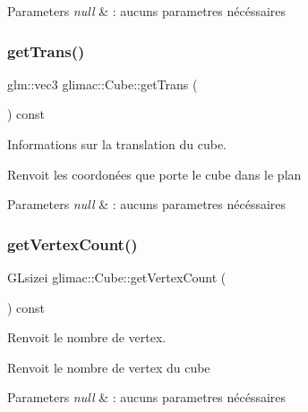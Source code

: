 \begin{DoxyParams}{Parameters}
{\em null} & \+: aucuns parametres nécéssaires \\
\hline
\end{DoxyParams}
\mbox{\label{classglimac_1_1Cube_a3531861251095864b9cc054ed14e81e4}} 
\subsubsection{\texorpdfstring{get\+Trans()}{getTrans()}}
{\footnotesize\ttfamily glm\+::vec3 glimac\+::\+Cube\+::get\+Trans (\begin{DoxyParamCaption}{ }\end{DoxyParamCaption}) const\hspace{0.3cm}{\ttfamily [inline]}}



Informations sur la translation du cube. 

Renvoit les coordonées que porte le cube dans le plan


\begin{DoxyParams}{Parameters}
{\em null} & \+: aucuns parametres nécéssaires \\
\hline
\end{DoxyParams}
\mbox{\label{classglimac_1_1Cube_a579f0c59b840981a71c3fb068d290bfc}} 
\subsubsection{\texorpdfstring{get\+Vertex\+Count()}{getVertexCount()}}
{\footnotesize\ttfamily G\+Lsizei glimac\+::\+Cube\+::get\+Vertex\+Count (\begin{DoxyParamCaption}{ }\end{DoxyParamCaption}) const\hspace{0.3cm}{\ttfamily [inline]}}



Renvoit le nombre de vertex. 

Renvoit le nombre de vertex du cube


\begin{DoxyParams}{Parameters}
{\em null} & \+: aucuns parametres nécéssaires \\
\hline
\end{DoxyParams}
\mbox{\label{classglimac_1_1Cube_a46cb8692b9572361e283e88913089bad}} 
